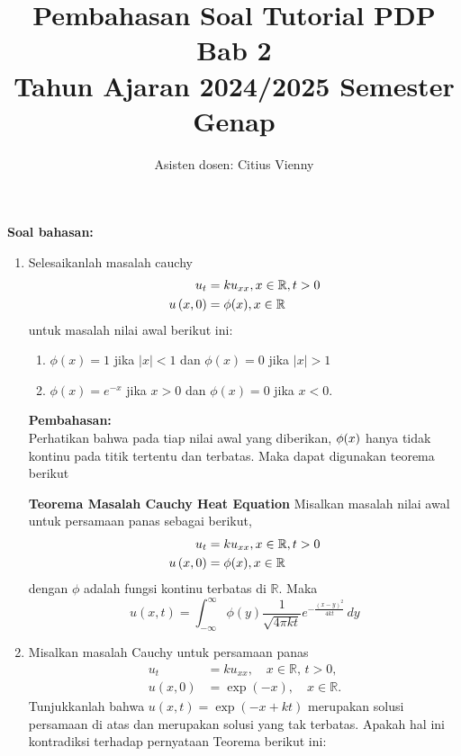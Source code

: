 \documentclass{article}
\title{Pembahasan Soal Tutorial PDP Bab 2 \\
Tahun Ajaran 2024/2025 Semester Genap}
\author{Asisten dosen: Citius Vienny}
\begin{document}
\maketitle

\noindent

\noindent
\textbf{Soal bahasan:}
\begin{enumerate}
    \item Selesaikanlah masalah cauchy
\begin{align*}
u_t &= ku_{xx}, x \in \mathbb{R}, t > 0 \\
u\left(x,0\right) &= \phi{\left(x\right)}, x \in \mathbb{R}
\end{align*}
untuk masalah nilai awal berikut ini:
\begin{enumerate}
\item $\phi(x) = 1$ jika $|x| < 1$ dan $\phi(x) = 0$ jika $|x| > 1$
\item $\phi(x) = e^{-x}$ jika $x > 0$ dan $\phi(x) = 0$ jika $x < 0$.
\end{enumerate}

\textbf{Pembahasan:} \\
Perhatikan bahwa pada tiap nilai awal yang diberikan, $\phi{\left(x\right)}$ hanya tidak kontinu pada titik tertentu dan terbatas. Maka dapat digunakan teorema berikut

\textbf{Teorema Masalah Cauchy Heat Equation}
Misalkan masalah nilai awal untuk persamaan panas sebagai berikut,
\begin{align*}
u_t &= ku_{xx}, x \in \mathbb{R}, t > 0 \\
u\left(x,0\right) &= \phi{\left(x\right)}, x \in \mathbb{R}
\end{align*}
dengan $\phi$ adalah fungsi kontinu terbatas di $\mathbb{R}$. Maka \[  
u(x, t) = \int_{-\infty}^{\infty} \phi(y) \frac{1}{\sqrt{4 \pi kt}} e^{-\frac{(x-y)^2}{4kt}} \, dy  
\]

\item Misalkan masalah Cauchy untuk persamaan panas
\begin{align*}
u_t &= k u_{xx}, \quad x \in \mathbb{R}, \, t > 0, \\
u(x, 0) &= \exp(-x), \quad x \in \mathbb{R}.
\end{align*}
Tunjukkanlah bahwa \( u(x, t) = \exp(-x + kt) \) merupakan solusi persamaan di atas dan merupakan solusi yang tak terbatas. Apakah hal ini kontradiksi terhadap pernyataan Teorema berikut ini:


\end{enumerate}
\end{document}
